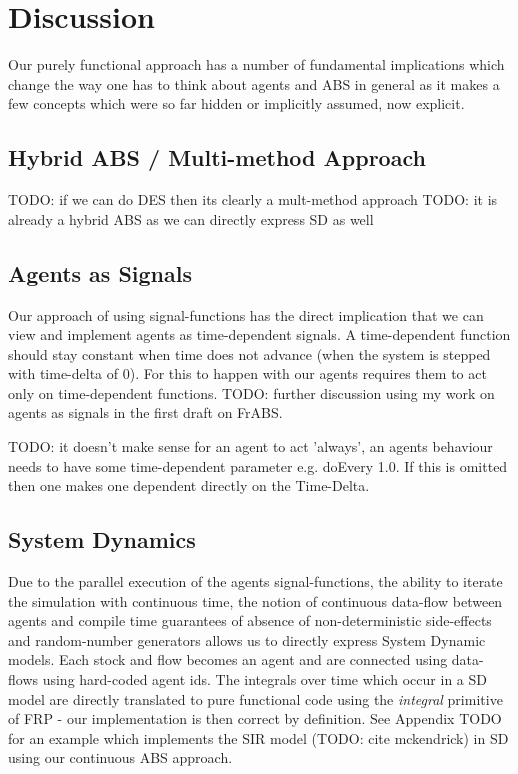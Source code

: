 \section{Discussion}
Our purely functional approach has a number of fundamental implications which change the way one has to think about agents and ABS in general as it makes a few concepts which were so far hidden or implicitly assumed, now explicit. 

\subsection{Hybrid ABS / Multi-method Approach}
TODO: if we can do DES then its clearly a mult-method approach
TODO: it is already a hybrid ABS as we can directly express SD as well

\subsection{Agents as Signals}
Our approach of using signal-functions has the direct implication that we can view and implement agents as time-dependent signals. A time-dependent function should stay constant when time does not advance (when the system is stepped with time-delta of 0). For this to happen with our agents requires them to act only on time-dependent functions. TODO: further discussion using my work on agents as signals in the first draft on FrABS.

TODO: it doesn't make sense for an agent to act 'always', an agents behaviour needs to have some time-dependent parameter e.g. doEvery 1.0. If this is omitted then one makes one dependent directly on the Time-Delta.

\subsection{System Dynamics}
Due to the parallel execution of the agents signal-functions, the ability to iterate the simulation with continuous time, the notion of continuous data-flow between agents and compile time guarantees of absence of non-deterministic side-effects and random-number generators allows us to directly express System Dynamic models.
Each stock and flow becomes an agent and are connected using data-flows using hard-coded agent ids. The integrals over time which occur in a SD model are directly translated to pure functional code using the \textit{integral} primitive of FRP - our implementation is then correct by definition.
See Appendix TODO for an example which implements the SIR model (TODO: cite mckendrick) in SD using our continuous ABS approach.